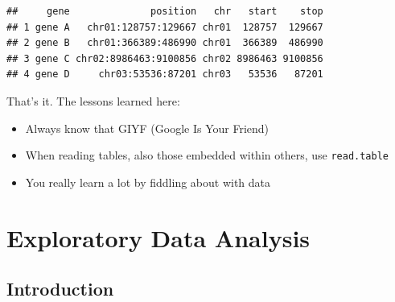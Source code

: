 \documentclass[]{book}
\newenvironment{Shaded}{\begin{snugshade}}{\end{snugshade}}
\newcommand{\DataTypeTok}[1]{\textcolor[rgb]{0.13,0.29,0.53}{#1}}
\newcommand{\DecValTok}[1]{\textcolor[rgb]{0.00,0.00,0.81}{#1}}
\newcommand{\KeywordTok}[1]{\textcolor[rgb]{0.13,0.29,0.53}{\textbf{#1}}}
\newcommand{\NormalTok}[1]{#1}
\newcommand{\OperatorTok}[1]{\textcolor[rgb]{0.81,0.36,0.00}{\textbf{#1}}}
\newcommand{\StringTok}[1]{\textcolor[rgb]{0.31,0.60,0.02}{#1}}
\providecommand{\tightlist}{%
  \setlength{\itemsep}{0pt}\setlength{\parskip}{0pt}}
\begin{document}
\begin{Shaded}
\end{Shaded}

\begin{verbatim}
##     gene              position   chr   start    stop
## 1 gene A   chr01:128757:129667 chr01  128757  129667
## 2 gene B   chr01:366389:486990 chr01  366389  486990
## 3 gene C chr02:8986463:9100856 chr02 8986463 9100856
## 4 gene D     chr03:53536:87201 chr03   53536   87201
\end{verbatim}

That's it. The lessons learned here:

\begin{itemize}
\tightlist
\item
  Always know that GIYF (Google Is Your Friend)
\item
  When reading tables, also those embedded within others, use \texttt{read.table}
\item
  You really learn a lot by fiddling about with data
\end{itemize}

\hypertarget{exploratory-data-analysis}{%
\chapter{Exploratory Data Analysis}\label{exploratory-data-analysis}}

\hypertarget{introduction-1}{%
\section{Introduction}\label{introduction-1}}
\end{document}
